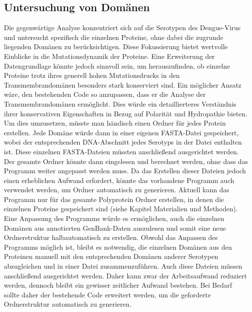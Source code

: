 \documentclass[german,version-2022-01]{uzl-thesis}
\begin{document}
\subsection{Untersuchung von Dom\"anen}
Die gegenw\"artige Analyse konzentriert sich auf die Serotypen des Dengue-Virus und untersucht spezifisch die einzelnen Proteine, ohne dabei die zugrunde liegenden Dom\"anen zu ber\"ucksichtigen. Diese Fokussierung bietet wertvolle Einblicke in die Mutationsdynamik der Proteine. Eine Erweiterung der Datengrundlage k\"onnte jedoch sinnvoll sein, um herauszufinden, ob einzelne Proteine trotz ihres generell hohen Mutationsdrucks in den Transmembrandom\"anen besonders stark konserviert sind. Ein m\"oglicher Ansatz w\"are, den bestehenden Code so anzupassen, dass er die Analyse der Transmembrandom\"anen erm\"oglicht. Dies w\"urde ein detaillierteres Verst\"andnis ihrer konservativen Eigenschaften in Bezug auf Polarit\"at und Hydropathie bieten. Um dies umzusetzen, m\"usste man h\"andisch einen Ordner f\"ur jedes Protein erstellen. Jede Dom\"ane w\"urde dann in einer eigenen FASTA-Datei gespeichert, wobei der entsprechenden DNA-Abschnitt jedes Serotyps in der Datei enthalten ist. Diese einzelnen FASTA-Dateien m\"ussten anschlie\ss{}end ausgerichtet werden. Der gesamte Ordner k\"onnte dann eingelesen und berechnet werden, ohne dass das Programm weiter angepasst werden muss. Da das Erstellen dieser Dateien jedoch einen erheblichen Aufwand erfordert, k\"onnte das vorhandene Programm auch verwendet werden, um Ordner automatisch zu generieren. Aktuell kann das Programm nur f\"ur das gesamte Polyprotein Ordner erstellen, in denen die einzelnen Proteine gespeichert sind (siehe Kapitel Materialien und Methoden). Eine Anpassung des Programms w\"urde es erm\"oglichen, auch die einzelnen Dom\"anen aus annotierten GenBank-Daten auszulesen und somit eine neue Ordnerstruktur halbautomatisch zu erstellen. Obwohl das Anpassen des Programms m\"oglich ist, bleibt es notwendig, die einzelnen Dom\"anen aus den Proteinen manuell mit den entsprechenden Dom\"anen anderer Serotypen abzugleichen und in einer Datei zusammenzuf\"uhren. Auch diese Dateien m\"ussen anschlie\ss{}end ausgerichtet werden. Daher kann zwar der Arbeitsaufwand reduziert werden, dennoch bleibt ein gewisser zeitlicher Aufwand bestehen. Bei Bedarf sollte daher der bestehende Code erweitert werden, um die geforderte Ordnerstruktur automatisch zu generieren.
\end{document}
